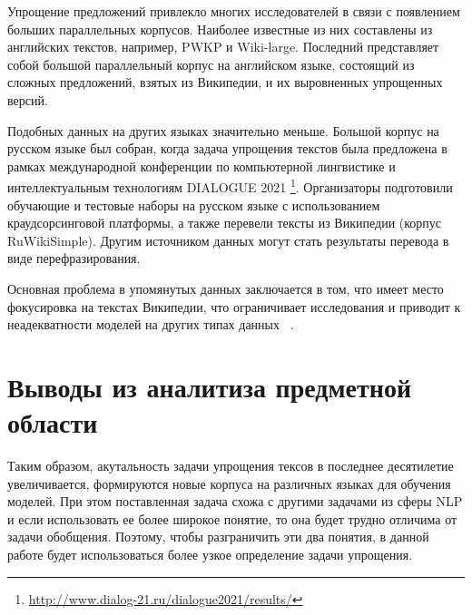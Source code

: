 Упрощение предложений привлекло многих исследователей в связи с появлением больших параллельных корпусов. Наиболее известные из них составлены из английских текстов, например, PWKP и Wiki-large. Последний представляет собой большой параллельный корпус на английском языке, состоящий из сложных предложений, взятых из Википедии, и их выровненных упрощенных версий.

Подобных данных на других языках значительно меньше. Большой корпус на русском языке был собран, когда задача упрощения текстов была предложена в рамках международной конференции по компьютерной лингвистике и интеллектуальным технологиям DIALOGUE 2021 \footnote{\url{http://www.dialog-21.ru/dialogue2021/results/}}. Организаторы подготовили обучающие и тестовые наборы на русском языке с использованием краудсорсинговой платформы, а также перевели тексты из Википедии (корпус RuWikiSimple). Другим источником данных могут стать результаты перевода в виде перефразирования\cite{kazan_federal_university}.  

Основная проблема в упомянутых данных заключается в том, что имеет место фокусировка на текстах Википедии, что ограничивает исследования и приводит к неадекватности моделей на других типах данных ~\cite{kazan_federal_university}. 



\section*{Выводы из аналитиза предметной области}

Таким образом, акутальность задачи упрощения тексов в последнее десятилетие увеличивается, формируются новые корпуса на различных языках для обучения моделей.  При этом поставленная задача схожа с другими задачами из сферы NLP и если использовать ее более широкое понятие, то она будет трудно отличима от задачи обобщения. Поэтому, чтобы разграничить эти два понятия, в данной работе будет использоваться более узкое определение задачи упрощения.

